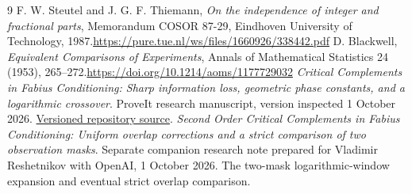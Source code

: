 \documentclass[11pt,a4paper]{article}
\theoremstyle{remark}\newtheorem*{ednote}{Editorial note (ProveIt, 2026-10-01)}
\begin{document}
\begin{thebibliography}{9}\small
{} F. W. Steutel and J. G. F. Thiemann, \emph{On the independence of integer and fractional parts}, Memorandum COSOR 87-29, Eindhoven University of Technology, 1987.\newline\url{https://pure.tue.nl/ws/files/1660926/338442.pdf}
 D. Blackwell, \emph{Equivalent Comparisons of Experiments}, Annals of Mathematical Statistics 24 (1953), 265--272.\newline\url{https://doi.org/10.1214/aoms/1177729032}
 \emph{Critical Complements in Fabius Conditioning: Sharp information loss, geometric phase constants, and a logarithmic crossover}. ProveIt research manuscript, version inspected 1 October 2026.\newline
\href{https://github.com/VladimirReshetnikov/ProveIt/blob/7421a4ca60fdf125411edf412f825aac54278b37/Analysis/FabiusFunction/docs/semi-formalized-research-frontiers/drafts/representations/Critical_Complements_Sharp_Information_Loss/article.tex}{Versioned repository source}.
 \emph{Second Order Critical Complements in Fabius Conditioning: Uniform overlap corrections and a strict comparison of two observation masks}. Separate companion research note prepared for Vladimir Reshetnikov with OpenAI, 1 October 2026. The two-mask logarithmic-window expansion and eventual strict overlap comparison.
\end{thebibliography}
\end{document}
